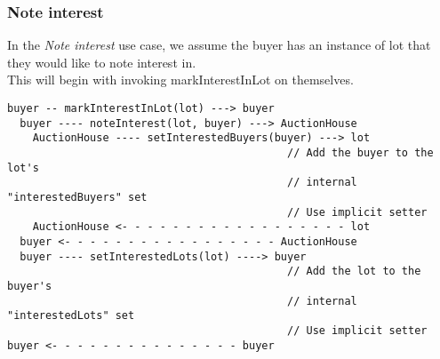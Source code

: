 \documentclass[titlepage, 12pt]{extarticle}
\begin{document}
\subsubsection{Note interest}
In the {\it Note interest} use case, we assume the buyer has an instance of lot that they would like to note interest in.\\
This will begin with invoking markInterestInLot on themselves.
\begin{verbatim}
buyer -- markInterestInLot(lot) ---> buyer
  buyer ---- noteInterest(lot, buyer) ---> AuctionHouse
    AuctionHouse ---- setInterestedBuyers(buyer) ---> lot
                                            // Add the buyer to the lot's
                                            // internal "interestedBuyers" set
                                            // Use implicit setter
    AuctionHouse <- - - - - - - - - - - - - - - - - - lot
  buyer <- - - - - - - - - - - - - - - - - AuctionHouse
  buyer ---- setInterestedLots(lot) ----> buyer 
                                            // Add the lot to the buyer's
                                            // internal "interestedLots" set
                                            // Use implicit setter
buyer <- - - - - - - - - - - - - - - buyer
\end{verbatim}
\end{document}
